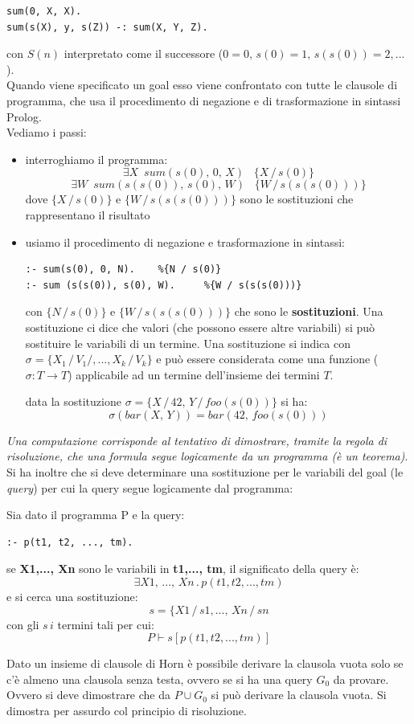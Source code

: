 \documentclass[a4paper,12pt, oneside]{book}
\begin{document}
\begin{verbatim}
sum(0, X, X).
sum(s(X), y, s(Z)) -: sum(X, Y, Z).
\end{verbatim}
con $S(n)$ interpretato come il successore ($0=0,\, s(0)=1, \,s(s(0))=2,... $).\\
Quando viene specificato un goal esso viene confrontato con tutte le clausole di programma, che usa il procedimento di negazione e di trasformazione in sintassi Prolog.\\
Vediamo i passi:
\begin{itemize}
	\item  interroghiamo il programma:
	      $$\exists X\,\,\, sum(s(0),\, 0,\, X)\,\,\,\,\,\{X\,/\, s(0)\}$$
	      $$\exists W\,\,\, sum(s(s(0)),\, s(0), \, W)\,\,\,\,\,\{W\,/\, s(s(s(0)))\}$$
	      dove $\{X\,/\, s(0)\}$ e $\{W\,/\, s(s(s(0)))\}$ sono le sostituzioni che rappresentano il risultato
	\item usiamo il procedimento di negazione e trasformazione in sintassi:
	      \begin{verbatim}
:- sum(s(0), 0, N).    %{N / s(0)}
:- sum (s(s(0)), s(0), W).     %{W / s(s(s(0)))}
\end{verbatim}
	      con $\{N\, /\, s(0)\}$ e $\{W \,/\, s(s(s(0)))\}$ che sono le \textbf{sostituzioni}. Una sostituzione ci dice che valori (che possono essere altre variabili) si può sostituire le variabili di un termine. Una sostituzione si indica con $\sigma=\{X_1\,/\,V_1/,..., X_k\,/\,V_k\}$ e può essere considerata come una funzione ($\sigma: T\to T$) applicabile ad un termine dell'insieme dei termini $T$.
	      \begin{esempio}
		      data la sostituzione $\sigma=\{X\,/\,42,\,Y\,/\, foo(s(0))\}$ si ha:
		      $$\sigma(bar(X,\,Y))=bar(42, \, foo(s(0)))$$
	      \end{esempio}
\end{itemize}
\newpage
\textit{Una computazione corrisponde al tentativo di dimostrare, tramite la regola di risoluzione, che una formula segue logicamente da un programma (è un teorema)}. Si ha inoltre che si deve determinare una sostituzione per le variabili del goal (le \textit{query}) per cui la query segue  logicamente dal programma:
\begin{esempio}
	Sia dato il programma P e la query:
	\begin{verbatim}
:- p(t1, t2, ..., tm).
\end{verbatim}
	se \textbf{X1,..., Xn} sono le variabili in \textbf{t1,..., tm}, il significato della query è:
	$$\exists X1,\,..., \,Xn\, . \,p(t1, t2, ..., tm)$$
	e si cerca una sostituzione:
	$$s=\{X1\,/\,s1,...,\, Xn\,/\,sn$$
	con gli $s\,i$ termini tali per cui:
	$$P\vdash s[p(t1, t2, ..., tm)]$$
\end{esempio}
Dato un insieme di clausole di Horn è possibile derivare la clausola vuota solo se c'è almeno una clausola senza testa, ovvero se si ha una query $G_0$ da provare. Ovvero si deve dimostrare che da $P\cup G_0$ si può derivare la clausola vuota. Si dimostra per assurdo col principio di risoluzione.
\end{document}
